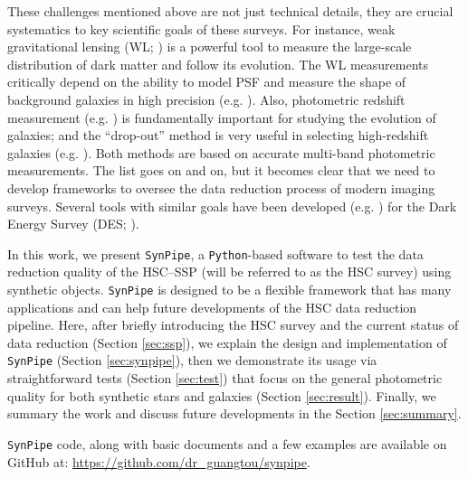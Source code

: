 \documentclass[useamsfonts]{pasj01}
\def\synpipe{\texttt{SynPipe}}
\begin{document}
    These challenges mentioned above are not just technical details, they are crucial
    systematics to key scientific goals of these surveys.
    For instance, weak gravitational lensing (WL; \citealt{Kaiser1993, Bartelmann2001})
    is a powerful tool to measure the large-scale distribution of dark matter and
    follow its evolution.
    The WL measurements critically depend on the ability to model PSF and measure the
    shape of background galaxies in high precision (e.g. \citealt{Mandelbaum2015}).
    Also, photometric redshift measurement (e.g. \citealt{Benitez2000, Bolzonella2000,
    Ilbert2009}) is fundamentally important for studying the evolution of galaxies;
    and the ``drop-out'' method is very useful in selecting high-redshift galaxies
    (e.g. \citealt{Steidel1996}).
    Both methods are based on accurate multi-band photometric measurements.
    The list goes on and on, but it becomes clear that we need to develop frameworks
    to oversee the data reduction process of modern imaging surveys.
    Several tools with similar goals have been developed (e.g. \citealt{Chang2015,
    Suchyta2016}) for the Dark Energy Survey (DES; \citealt{DES2005}).

    In this work, we present \synpipe{}, a \texttt{Python}-based
    software to test the data reduction quality of the HSC--SSP (will be referred to
    as the HSC survey) using synthetic objects.
    \synpipe{} is designed to be a flexible framework that has many applications
    and can help future developments of the HSC data reduction pipeline.
    Here, after briefly introducing the HSC survey and the current status of
    data reduction (Section \ref{sec:ssp}), we explain the design and implementation
    of \synpipe{} (Section \ref{sec:synpipe}), then we demonstrate its usage via
    straightforward tests (Section \ref{sec:test}) that focus on the general
    photometric quality for both synthetic stars and galaxies
    (Section \ref{sec:result}).
    Finally, we summary the work and discuss future developments in the
    Section \ref{sec:summary}.

    \synpipe{} code, along with basic documents and a few examples are available
    on GitHub at: \url{https://github.com/dr_guangtou/synpipe}.
\end{document}
